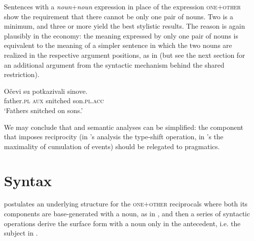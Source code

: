 \documentclass[output=paper,colorlinks,citecolor=brown]{langscibook}
\begin{document}
Sentences with a \textit{noun}+\textit{noun} expression in place of the expression \textsc{one$+$other} show the requirement that there cannot be only one pair of nouns. Two is a minimum, and three or more yield the best stylistic results. The reason is again plausibly in the economy: the meaning expressed by only one pair of nouns is equivalent to the meaning of a simpler sentence in which the two nouns are realized in the respective argument positions, as in  (but see the next section for an additional argument from the syntactic mechanism behind the shared restriction).

\ea\label{ex:arsenijevic:Otac2}
\gll Očevi su potkazivali sinove.\\
 father.\textsc{pl} \textsc{aux} snitched son.\textsc{pl}.\textsc{acc}\\
 \glt `Fathers snitched on sons.'
 \z

\noindent We may conclude that  and  semantic analyses can be simplified: the component that imposes reciprocity (in \citeauthor{z14}'s analysis the type-shift operation, in \citeauthor{v10}'s the maximality of cumulation of events) should be relegated to pragmatics.

\section{Syntax}\label{sec:arsenijevic:5}

\citet{z14} postulates an underlying structure for the \textsc{one$+$other} reciprocals where both its components are base-generated with a noun, as in , and then a series of syntactic operations derive the surface form with a noun only in the antecedent, i.e. the subject in .

\ea\label{ex:arsenijevic:Slikari1}
 \label{ex:arsenijevic:Slikari1-a}
 
\label{ex:arsenijevic:Slikari1-b}
\z \z
\end{document}

